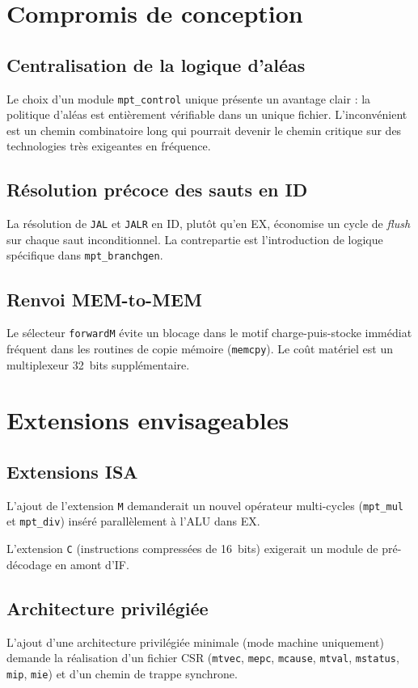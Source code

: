 \documentclass[11pt,a4paper,oneside]{report}
\begin{document}
\section{Compromis de conception}
\subsection{Centralisation de la logique d'aléas}
Le choix d'un module \texttt{mpt\_control} unique présente un
avantage clair : la politique d'aléas est entièrement vérifiable
dans un unique fichier. L'inconvénient est un chemin combinatoire
long qui pourrait devenir le chemin critique sur des technologies
très exigeantes en fréquence.

\subsection{Résolution précoce des sauts en ID}
La résolution de \texttt{JAL} et \texttt{JALR} en ID, plutôt qu'en
EX, économise un cycle de \textit{flush} sur chaque saut
inconditionnel. La contrepartie est l'introduction de logique
spécifique dans \texttt{mpt\_branchgen}.

\subsection{Renvoi MEM-to-MEM}
Le sélecteur \texttt{forwardM} évite un blocage dans le motif
\og{}charge-puis-stocke immédiat\fg{} fréquent dans les routines de
copie mémoire (\texttt{memcpy}). Le coût matériel est un
multiplexeur 32~bits supplémentaire.

\section{Extensions envisageables}
\subsection{Extensions ISA}
L'ajout de l'extension \texttt{M} demanderait un nouvel opérateur
multi-cycles (\texttt{mpt\_mul} et \texttt{mpt\_div}) inséré
parallèlement à l'ALU dans EX.

L'extension \texttt{C} (instructions compressées de 16~bits)
exigerait un module de pré-décodage en amont d'IF.

\subsection{Architecture privilégiée}
L'ajout d'une architecture privilégiée minimale (mode machine
uniquement) demande la réalisation d'un fichier CSR
(\texttt{mtvec}, \texttt{mepc}, \texttt{mcause},
\texttt{mtval}, \texttt{mstatus}, \texttt{mip}, \texttt{mie}) et
d'un chemin de trappe synchrone.
\end{document}
